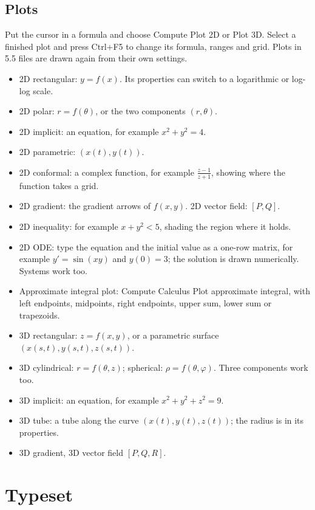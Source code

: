 \subsection{Plots}

Put the cursor in a formula and choose Compute \TEXTsymbol{>} Plot 2D or Plot 3D. Select a finished plot and press Ctrl+F5 to change its formula, ranges and grid. Plots in 5.5 files are drawn again from their own settings.

\begin{itemize}
\item 2D rectangular: $y=f(x)$. Its properties can switch to a logarithmic or log-log scale.
\item 2D polar: $r=f(\theta)$, or the two components $(r,\theta)$.
\item 2D implicit: an equation, for example $x^{2}+y^{2}=4$.
\item 2D parametric: $(x(t),y(t))$.
\item 2D conformal: a complex function, for example $\frac{z-1}{z+1}$, showing where the function takes a grid.
\item 2D gradient: the gradient arrows of $f(x,y)$. 2D vector field: $[P,Q]$.
\item 2D inequality: for example $x+y^{2}<5$, shading the region where it holds.
\item 2D ODE: type the equation and the initial value as a one-row matrix, for example $y'=\sin (xy)$ and $y(0)=3$; the solution is drawn numerically. Systems work too.
\item Approximate integral plot: Compute \TEXTsymbol{>} Calculus \TEXTsymbol{>} Plot approximate integral, with left endpoints, midpoints, right endpoints, upper sum, lower sum or trapezoids.
\item 3D rectangular: $z=f(x,y)$, or a parametric surface $(x(s,t),y(s,t),z(s,t))$.
\item 3D cylindrical: $r=f(\theta ,z)$; spherical: $\rho =f(\theta ,\varphi )$. Three components work too.
\item 3D implicit: an equation, for example $x^{2}+y^{2}+z^{2}=9$.
\item 3D tube: a tube along the curve $(x(t),y(t),z(t))$; the radius is in its properties.
\item 3D gradient, 3D vector field $[P,Q,R]$.
\end{itemize}

\section{Typeset}


